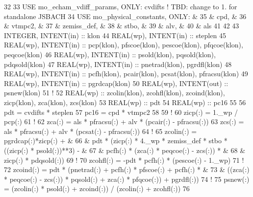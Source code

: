 \begin{DoxyCode}
32 
33     \textcolor{keywordtype}{USE }mo\_echam\_vdiff\_params\textcolor{keywordtype}{, ONLY}: cvdifts   \textcolor{comment}{! TBD: change to 1. for standalone JSBACH}
34     \textcolor{keywordtype}{USE }mo\_physical\_constants\textcolor{keywordtype}{, ONLY}: &
35       & cpd, &
36       & vtmpc2, &
37       & zemiss\_def, &
38       & stbo, &
39       & alv,  &
40       & als
41 
42 
43     \textcolor{keywordtype}{INTEGER},  \textcolor{keywordtype}{INTENT(in)}    :: klon
44     \textcolor{keywordtype}{REAL(wp)}, \textcolor{keywordtype}{INTENT(in)}    :: steplen
45     \textcolor{keywordtype}{REAL(wp)}, \textcolor{keywordtype}{INTENT(in)}    :: pcp(klon), pfscoe(klon), pescoe(klon), pfqcoe(klon), peqcoe(klon)
46     \textcolor{keywordtype}{REAL(wp)}, \textcolor{keywordtype}{INTENT(in)}    :: psold(klon), pqsold(klon), pdqsold(klon)
47     \textcolor{keywordtype}{REAL(wp)}, \textcolor{keywordtype}{INTENT(in)}    :: pnetrad(klon), pgrdfl(klon)
48     \textcolor{keywordtype}{REAL(wp)}, \textcolor{keywordtype}{INTENT(in)}    :: pcfh(klon), pcair(klon), pcsat(klon), pfracsu(klon)
49     \textcolor{keywordtype}{REAL(wp)}, \textcolor{keywordtype}{INTENT(in)}    :: pgrdcap(klon)
50     \textcolor{keywordtype}{REAL(wp)}, \textcolor{keywordtype}{INTENT(out)}   :: psnew(klon)
51     \textcolor{comment}{!}
52     \textcolor{keywordtype}{REAL(wp)} :: zcolin(klon), zcohfl(klon), zcoind(klon), zicp(klon), zca(klon), zcs(klon)
53     \textcolor{keywordtype}{REAL(wp)} :: pdt
54     \textcolor{keywordtype}{REAL(wp)} :: pc16
55 
56     pdt     = cvdifts * steplen
57     pc16    = cpd * vtmpc2
58 
59     \textcolor{comment}{!}
60     zicp(:) = 1.\_wp / pcp(:)
61     \textcolor{comment}{!}
62     zca(:)    = als * pfracsu(:) +  alv * (pcair(:) - pfracsu(:))
63     zcs(:)    = als * pfracsu(:) +  alv * (pcsat(:) - pfracsu(:))
64     \textcolor{comment}{!}
65     zcolin(:) = pgrdcap(:)*zicp(:) +                                                              &
66               &      pdt * (zicp(:) * 4.\_wp * zemiss\_def * stbo * ((zicp(:) * psold(:))**3)  -    &
67               &      pcfh(:) * (zca(:) * peqcoe(:) - zcs(:)) *                                    &
68               &      zicp(:) * pdqsold(:))
69     \textcolor{comment}{!}
70     zcohfl(:) = -pdt * pcfh(:) * (pescoe(:) - 1.\_wp)
71     \textcolor{comment}{!}
72     zcoind(:) = pdt * (pnetrad(:) + pcfh(:) * pfscoe(:) +  pcfh(:) *                              &
73               &      ((zca(:) * peqcoe(:) - zcs(:)) * pqsold(:) + zca(:) * pfqcoe(:)) + pgrdfl(:))
74     \textcolor{comment}{!}
75     psnew(:)  = (zcolin(:) * psold(:) + zcoind(:)) / (zcolin(:) + zcohfl(:))
76 
\end{DoxyCode}



